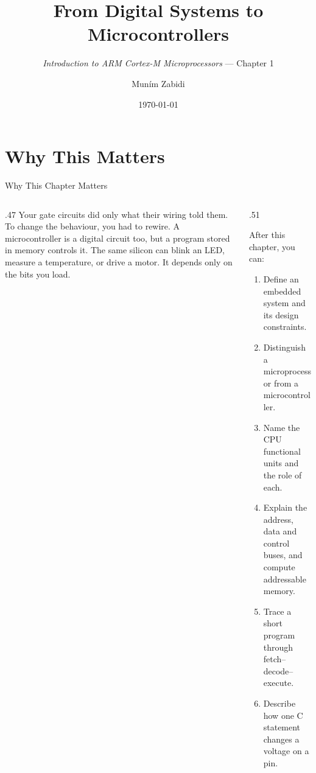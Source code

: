\documentclass[9pt,aspectratio=169,xcolor=table]{beamer}
\title{From Digital Systems to Microcontrollers}
\subtitle{\emph{Introduction to ARM Cortex-M Microprocessors} --- Chapter 1}
\author{Mun\'{i}m Zabidi}
\institute{\color{primary}Faculty of Electrical Engineering, Universiti Teknologi Malaysia}
\date{\today}
\begin{document}
\titlepage

\section{Why This Matters}

\begin{frame}{Why This Chapter Matters}
    \begin{columns}[c]
    \begin{column}{.47\textwidth}
        {\normalsize Your gate circuits did only what their \alert{wiring} told them. To change the behaviour, you had to rewire. A microcontroller is a digital circuit too, but a \alert{program stored in memory} controls it. The same silicon can blink an LED, measure a temperature, or drive a motor. It depends only on the bits you load.}
    \end{column}
    \begin{column}{.51\textwidth}
        \begin{block}{After this chapter, you can:}
        {\small
        \begin{enumerate}\itemsep2pt
            \item Define an embedded system and its design constraints.
            \item Distinguish a \alert{microprocessor} from a \alert{microcontroller}.
            \item Name the CPU functional units and the role of each.
            \item Explain the address, data and control buses, and compute addressable memory.
            \item Trace a short program through fetch--decode--execute.
            \item Describe how one C statement changes a voltage on a pin.
        \end{enumerate}}
        \end{block}
    \end{column}
    \end{columns}
\end{frame}
\end{document}
